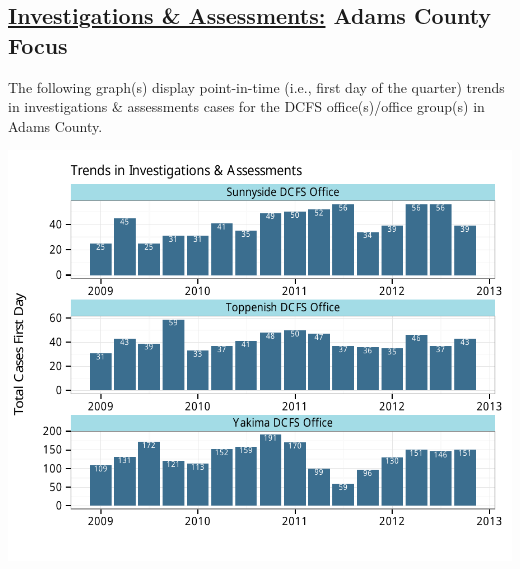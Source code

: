 \documentclass{article}\usepackage[]{graphicx}\usepackage[]{color}
\makeatletter
\def\maxwidth{ %
  \ifdim\Gin@nat@width>\linewidth
    \linewidth
  \else
    \Gin@nat@width
  \fi
}
\newenvironment{knitrout}{}{} %
\makeatother
\begin{document}
\begin{minipage}{\textwidth}
\subsection{\href{http://www.partnersforourchildren.org//child-well-being/visualizations/investigations-assessments/trends}
{Investigations \& Assessments:} Adams County Focus}
The following graph(s) display point-in-time (i.e., first day of the quarter) trends in investigations \& assessments cases for the DCFS office(s)/office group(s) in Adams County.  
\begin{knitrout}
\color{fgcolor}

{\centering \includegraphics[width=\maxwidth]{figure/ia_focus} 

}



\end{knitrout}

\end{minipage}

\newpage
\end{document}
